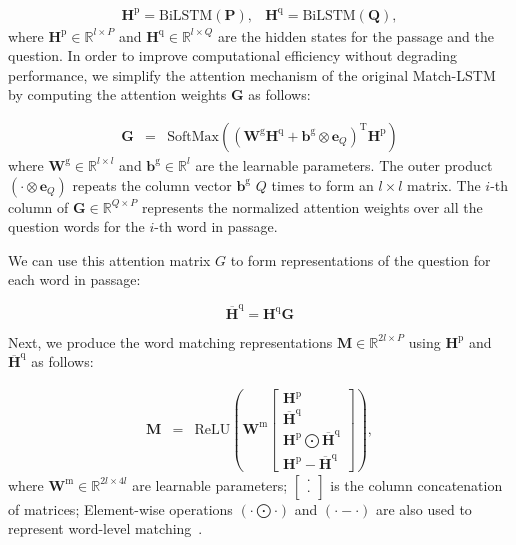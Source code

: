 \documentclass[letterpaper]{article} %
\begin{document}
\begin{equation}
\begin{matrix}
\mathbf{H}^{\text{p}} = \text{BiLSTM} (\mathbf{P}), & \mathbf{H}^{\text{q}} =\text{BiLSTM} (\mathbf{Q}),
\end{matrix}
\label{eqn:preprocess}
\end{equation}
where $\mathbf{H}^{\text{p}} \in \mathbb{R}^{l\times P}$ and $ \mathbf{H}^{\text{q}}\in \mathbb{R}^{l\times Q}$ are the hidden states for the passage and the question. 
In order to improve computational efficiency without degrading performance, we simplify the attention mechanism of the original Match-LSTM by computing the attention weights $\mathbf{G}$ as follows:



\begin{eqnarray}
\nonumber
\mathbf{G} & = & \text{SoftMax}\left( (\mathbf{W}^{\text{g}} \mathbf{H}^{\text{q}}+\mathbf{b}^\text{g}\otimes \mathbf{e}_Q)^\text{T} \mathbf{H}^{\text{p}} \right)
\label{eqn:alpha}
\end{eqnarray}
where $\mathbf{W}^{\text{g}}\in \mathbb{R}^{l\times l}$ and $\mathbf{b}^\text{g} \in \mathbb{R}^{l}$ are the learnable parameters. The outer product $(\cdot \otimes \mathbf{e}_Q)$ repeats the column vector $\mathbf{b}^{\text{g}}$ $Q$ times to form an $l \times l$ matrix. The $i$-th column of $\mathbf{G}\in \mathbb{R}^{Q\times P}$ represents the normalized attention weights over all the question words for the $i$-th word in passage.

We can use this attention matrix $G$ to form representations of the question for each word in passage:



\begin{equation}
\overline{\mathbf{H}}^{\text{q}} = \mathbf{H}^{\text{q}}\mathbf{G}
\end{equation}

Next, we produce the word matching representations $\mathbf{M}\in \mathbb{R}^{2l\times P}$ using  $\mathbf{H}^\text{p}$ and $\overline{\mathbf{H}}^\text{q}$ as follows:

\begin{eqnarray}
\mathbf{M} & = & \text{ReLU}\left(  \mathbf{W}^\text{m} \begin{bmatrix}
\mathbf{H}^{\text{p}}
\\ 
\overline{\mathbf{H}}^{\text{q}}
\\ 
 \mathbf{H}^{\text{p}} \bigodot \overline{\mathbf{H}}^{\text{q}}
\\ 
\mathbf{H}^{\text{p}} - \overline{\mathbf{H}}^{\text{q}}
\end{bmatrix} \right),
\label{eqn:match}
\end{eqnarray}
where $\mathbf{W}^\text{m}\in \mathbb{R}^{2l\times 4l}$ are learnable parameters; $\begin{bmatrix}
\cdot \\ \cdot \end{bmatrix}$ is the column concatenation of matrices; Element-wise operations $(\cdot \bigodot \cdot )$ and $(\cdot - \cdot )$ are also used to represent word-level matching~\cite{wang2016compare,Chen:2017:ACL}.
\end{document}
